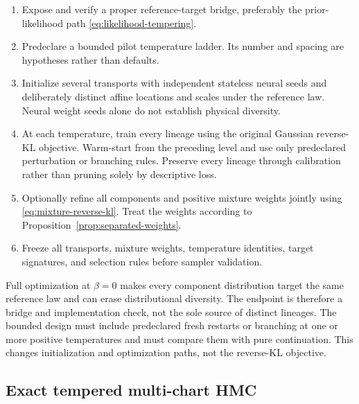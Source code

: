 \documentclass[11pt]{article}
\theoremstyle{definition}
\theoremstyle{remark}
\newcommand{\1}{\mathbf{1}}
\begin{document}
\begin{enumerate}
 \item Expose and verify a proper reference-target bridge, preferably the
 prior-likelihood path \eqref{eq:likelihood-tempering}.
 \item Predeclare a bounded pilot temperature ladder.  Its number and spacing
 are hypotheses rather than defaults.
 \item Initialize several transports with independent stateless neural seeds
 and deliberately distinct affine locations and scales under the reference
 law.  Neural weight seeds alone do not establish physical diversity.
 \item At each temperature, train every lineage using the original Gaussian
 reverse-KL objective.  Warm-start from the preceding level and use only
 predeclared perturbation or branching rules.  Preserve every lineage through
 calibration rather than pruning solely by descriptive loss.
 \item Optionally refine all components and positive mixture weights jointly
 using \eqref{eq:mixture-reverse-kl}.  Treat the weights according to
 Proposition~\ref{prop:separated-weights}.
 \item Freeze all transports, mixture weights, temperature identities, target
 signatures, and selection rules before sampler validation.
\end{enumerate}

Full optimization at $\beta=0$ makes every component distribution target the
same reference law and can erase distributional diversity.  The endpoint is
therefore a bridge and implementation check, not the sole source of distinct
lineages.  The bounded design must include predeclared fresh restarts or
branching at one or more positive temperatures and must compare them with pure
continuation.  This changes initialization and optimization paths, not the
reverse-KL objective.

\subsection{Exact tempered multi-chart HMC}
\end{document}
